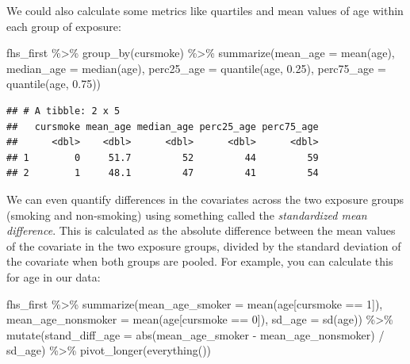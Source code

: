 \documentclass[
]{book}
\newenvironment{Shaded}{\begin{snugshade}}{\end{snugshade}}
\newcommand{\AttributeTok}[1]{\textcolor[rgb]{0.77,0.63,0.00}{#1}}
\newcommand{\DecValTok}[1]{\textcolor[rgb]{0.00,0.00,0.81}{#1}}
\newcommand{\FloatTok}[1]{\textcolor[rgb]{0.00,0.00,0.81}{#1}}
\newcommand{\FunctionTok}[1]{\textcolor[rgb]{0.00,0.00,0.00}{#1}}
\newcommand{\NormalTok}[1]{#1}
\newcommand{\SpecialCharTok}[1]{\textcolor[rgb]{0.00,0.00,0.00}{#1}}
\begin{document}
We could also calculate some metrics like quartiles and mean values of age within each group of exposure:

\begin{Shaded}
\begin{Highlighting}[]
\NormalTok{fhs\_first }\SpecialCharTok{\%\textgreater{}\%} 
  \FunctionTok{group\_by}\NormalTok{(cursmoke) }\SpecialCharTok{\%\textgreater{}\%} 
  \FunctionTok{summarize}\NormalTok{(}\AttributeTok{mean\_age =} \FunctionTok{mean}\NormalTok{(age), }
            \AttributeTok{median\_age =} \FunctionTok{median}\NormalTok{(age),}
            \AttributeTok{perc25\_age =} \FunctionTok{quantile}\NormalTok{(age, }\FloatTok{0.25}\NormalTok{), }
            \AttributeTok{perc75\_age =} \FunctionTok{quantile}\NormalTok{(age, }\FloatTok{0.75}\NormalTok{))}
\end{Highlighting}
\end{Shaded}

\begin{verbatim}
## # A tibble: 2 x 5
##   cursmoke mean_age median_age perc25_age perc75_age
##      <dbl>    <dbl>      <dbl>      <dbl>      <dbl>
## 1        0     51.7         52         44         59
## 2        1     48.1         47         41         54
\end{verbatim}

We can even quantify differences in the covariates across the two exposure groups (smoking and non-smoking) using something called the \emph{standardized mean difference}. This is calculated as the absolute difference between the mean values of the covariate in the two exposure groups, divided by the standard deviation of the covariate when both groups are pooled. For example, you can calculate this for age in our data:

\begin{Shaded}
\begin{Highlighting}[]
\NormalTok{fhs\_first }\SpecialCharTok{\%\textgreater{}\%} 
  \FunctionTok{summarize}\NormalTok{(}\AttributeTok{mean\_age\_smoker =} \FunctionTok{mean}\NormalTok{(age[cursmoke }\SpecialCharTok{==} \DecValTok{1}\NormalTok{]), }
            \AttributeTok{mean\_age\_nonsmoker =} \FunctionTok{mean}\NormalTok{(age[cursmoke }\SpecialCharTok{==} \DecValTok{0}\NormalTok{]), }
            \AttributeTok{sd\_age =} \FunctionTok{sd}\NormalTok{(age)) }\SpecialCharTok{\%\textgreater{}\%} 
  \FunctionTok{mutate}\NormalTok{(}\AttributeTok{stand\_diff\_age =} \FunctionTok{abs}\NormalTok{(mean\_age\_smoker }\SpecialCharTok{{-}}\NormalTok{ mean\_age\_nonsmoker) }\SpecialCharTok{/}\NormalTok{ sd\_age) }\SpecialCharTok{\%\textgreater{}\%} 
  \FunctionTok{pivot\_longer}\NormalTok{(}\FunctionTok{everything}\NormalTok{())}
\end{Highlighting}
\end{Shaded}
\end{document}
